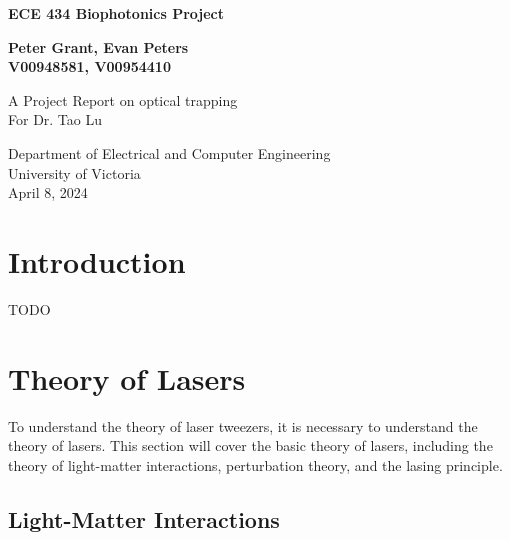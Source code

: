 \documentclass{article}
\begin{document}
\begin{titlepage}
    \begin{center}
        \vspace*{2cm}
 
        \huge
        \textbf{ECE 434 Biophotonics Project}
     
        \vspace{1.5cm}
        \Large
        \textbf{Peter Grant, Evan Peters\\
        V00948581, V00954410}
 
        \vfill
             
        A Project Report on optical trapping\\
        For Dr. Tao Lu     

        \vspace{0.8cm}
      

             
        Department of Electrical and Computer Engineering\\
        University of Victoria\\
        April 8, 2024
             
    \end{center}
\end{titlepage}


\tableofcontents
\newpage

\section*{Introduction}

TODO

\section*{Theory of Lasers}

To understand the theory of laser tweezers, it is necessary to understand the theory of lasers. This section will cover the basic theory of lasers, including the theory of light-matter interactions, perturbation theory, and the lasing principle.

\subsection*{Light-Matter Interactions}
\end{document}
